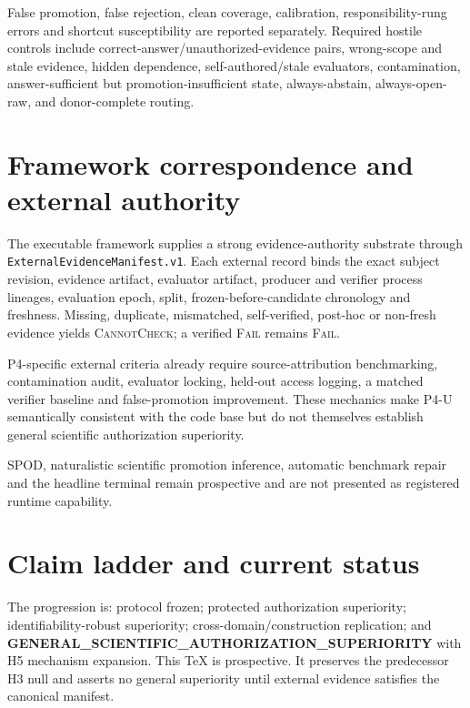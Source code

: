 \documentclass[11pt]{article}
\begin{document}
False promotion, false rejection, clean coverage, calibration, responsibility-rung errors and shortcut susceptibility are reported separately. Required hostile controls include correct-answer/unauthorized-evidence pairs, wrong-scope and stale evidence, hidden dependence, self-authored/stale evaluators, contamination, answer-sufficient but promotion-insufficient state, always-abstain, always-open-raw, and donor-complete routing.

\section{Framework correspondence and external authority}
The executable framework supplies a strong evidence-authority substrate through \texttt{ExternalEvidenceManifest.v1}. Each external record binds the exact subject revision, evidence artifact, evaluator artifact, producer and verifier process lineages, evaluation epoch, split, frozen-before-candidate chronology and freshness. Missing, duplicate, mismatched, self-verified, post-hoc or non-fresh evidence yields \textsc{CannotCheck}; a verified \textsc{Fail} remains \textsc{Fail}.

P4-specific external criteria already require source-attribution benchmarking, contamination audit, evaluator locking, held-out access logging, a matched verifier baseline and false-promotion improvement. These mechanics make P4-U semantically consistent with the code base but do not themselves establish general scientific authorization superiority.

SPOD, naturalistic scientific promotion inference, automatic benchmark repair and the headline terminal remain prospective and are not presented as registered runtime capability.

\section{Claim ladder and current status}
The progression is: protocol frozen; protected authorization superiority; identifiability-robust superiority; cross-domain/construction replication; and \textbf{GENERAL\_SCIENTIFIC\_AUTHORIZATION\_SUPERIORITY} with H5 mechanism expansion. This TeX is prospective. It preserves the predecessor H3 null and asserts no general superiority until external evidence satisfies the canonical manifest.
\end{document}
